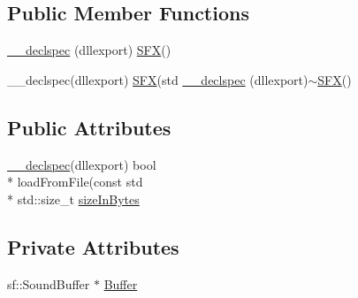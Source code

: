 \subsection*{Public Member Functions}
\begin{DoxyCompactItemize}
\item 
\hyperlink{class_s_f_x_ad0bad7013294fbf08c3cd4462a334e99}{\-\_\-\-\_\-declspec} (dllexport) \hyperlink{class_s_f_x}{S\-F\-X}()
\item 
\-\_\-\-\_\-declspec(dllexport) \hyperlink{class_s_f_x}{S\-F\-X}(std \hyperlink{class_s_f_x_a8cd59f6ff14fe2371dcd87dcedfd78a8}{\-\_\-\-\_\-declspec} (dllexport)$\sim$\hyperlink{class_s_f_x}{S\-F\-X}()
\end{DoxyCompactItemize}
\subsection*{Public Attributes}
\begin{DoxyCompactItemize}
\item 
\hyperlink{class_s_f_x_ad0bad7013294fbf08c3cd4462a334e99}{\-\_\-\-\_\-declspec}(dllexport) bool \\*
load\-From\-File(const std \\*
std\-::size\-\_\-t \hyperlink{class_s_f_x_a463deda3cac1d9c45a494ba33af8a9ea}{size\-In\-Bytes}
\end{DoxyCompactItemize}
\subsection*{Private Attributes}
\begin{DoxyCompactItemize}
\item 
sf\-::\-Sound\-Buffer $\ast$ \hyperlink{class_s_f_x_ae55cbdae082548b85511de868d03a9f2}{Buffer}
\end{DoxyCompactItemize}


